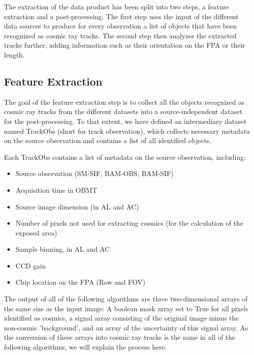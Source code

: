 \documentclass[a4paper, 11pt]{article}
\begin{document}
The extraction of the data product has been split into two steps, a feature extraction and a post-processing. The first step uses the input of the different data sources to produce for every observation a list of objects that have been recognized as cosmic ray tracks. The second step then analyzes the extracted tracks further, adding information such as their orientation on the FPA or their length.

\subsection{Feature Extraction}

The goal of the feature extraction step is to collect all the objects recognized as cosmic ray tracks from the different datasets into a source-independent dataset for the post-processing. To that extent, we have defined an intermediary dataset named TrackObs (short for track observation), which collects necessary metadata on the source observation and contains a list of all identified objects.

Each TrackObs contains a list of metadata on the source observation, including:
\begin{itemize}
  \item Source observation (SM-SIF, BAM-OBS, BAM-SIF)
  \item Acquisition time in OBMT
  \item Source image dimension (in AL and AC)
  \item Number of pixels not used for extracting cosmics (for the calculation of the exposed area)
  \item Sample binning, in AL and AC
  \item CCD gain
  \item Chip location on the FPA (Row and FOV)
\end{itemize}

The output of all of the following algorithms are three two-dimensional arrays of the same size as the input image: A boolean mask array set to True for all pixels identified as cosmics, a signal array consisting of the original image minus the non-cosmic 'background', and an array of the uncertainty of this signal array. As the conversion of these arrays into cosmic ray tracks is the same in all of the following algorithms, we will explain the process here. 
\end{document}
